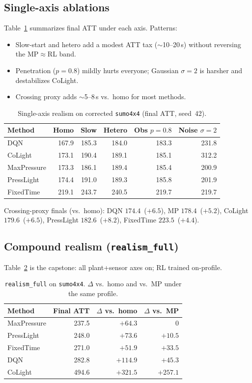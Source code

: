 \documentclass[11pt,a4paper]{article}
\begin{document}
\subsection{Single-axis ablations}
Table~\ref{tab:axes4x4} summarizes final ATT under each axis.
Patterns:
\begin{itemize}
  \item Slow-start and hetero add a modest ATT tax ($\sim$10--20\,s) without reversing the MP$\approx$RL band.
  \item Penetration ($p{=}0.8$) mildly hurts everyone; Gaussian $\sigma{=}2$ is harsher and destabilizes CoLight.
  \item Crossing proxy adds $\sim$5--8\,s vs.\ homo for most methods.
\end{itemize}

\begin{table}[t]
\centering
\caption{Single-axis realism on corrected \texttt{sumo4x4} (final ATT, seed~42).}
\label{tab:axes4x4}
\setlength{\tabcolsep}{4pt}
\begin{tabular}{lrrrrr}
\toprule
Method & Homo & Slow & Hetero & Obs $p{=}0.8$ & Noise $\sigma{=}2$ \\
\midrule
DQN         & 167.9 & 185.3 & 184.0 & 183.3 & 231.8 \\
CoLight     & 173.1 & 190.4 & 189.1 & 185.1 & 312.2 \\
MaxPressure & 173.3 & 186.1 & 189.4 & 185.4 & 200.9 \\
PressLight  & 174.4 & 191.0 & 189.3 & 185.8 & 201.9 \\
FixedTime   & 219.1 & 243.7 & 240.5 & 219.7 & 219.7 \\
\bottomrule
\end{tabular}
\end{table}

Crossing-proxy finals (vs.\ homo): DQN $174.4$~($+6.5$), MP $178.4$~($+5.2$), CoLight $179.6$~($+6.5$), PressLight $182.6$~($+8.2$), FixedTime $223.5$~($+4.4$).

\subsection{Compound realism (\texttt{realism\_full})}
Table~\ref{tab:full4x4} is the capstone: all plant+sensor axes on; RL trained on-profile.

\begin{table}[t]
\centering
\caption{\texttt{realism\_full} on \texttt{sumo4x4}. $\Delta$ vs.\ homo and vs.\ MP under the same profile.}
\label{tab:full4x4}
\begin{tabular}{lrrr}
\toprule
Method & Final ATT & $\Delta$ vs.\ homo & $\Delta$ vs.\ MP \\
\midrule
MaxPressure & 237.5 & $+64.3$ & $0$ \\
PressLight  & 248.0 & $+73.6$ & $+10.5$ \\
FixedTime   & 271.0 & $+51.9$ & $+33.5$ \\
DQN         & 282.8 & $+114.9$ & $+45.3$ \\
CoLight     & 494.6 & $+321.5$ & $+257.1$ \\
\bottomrule
\end{tabular}
\end{table}
\end{document}
